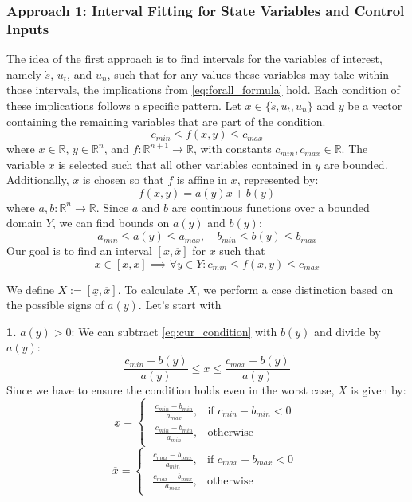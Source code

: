 \subsubsection{Approach 1: Interval Fitting for State Variables and Control Inputs} \label{subsubsec:interval_fitting}
The idea of the first approach is to find intervals for the variables of interest, namely $\dot{s}$, $u_t$, and $u_n$, such that for any values these
variables may take within those intervals, the implications from \eqref{eq:forall_formula} hold.
Each condition of these implications follows a specific pattern.
Let $x \in \{\dot{s}, u_t, u_n\}$ and $y$ be a vector containing the remaining variables that are part of the condition.
\begin{equation}
	\label{eq:cur_condition}
	c_{min} \leq f(x, y) \leq c_{max}
\end{equation}
where $x \in \mathbb{R}$, $y \in \mathbb{R}^n$, and $f: \mathbb{R}^{n+1} \to \mathbb{R}$, with constants $c_{min}, c_{max} \in \mathbb{R}$.
The variable $x$ is selected such that all other variables contained in $y$ are bounded.
Additionally, $x$ is chosen so that $f$ is affine in $x$, represented by:
\begin{equation}
	f(x, y) = a(y) x + b(y)
\end{equation}
where $a, b : \mathbb{R}^n \to \mathbb{R}$. Since $a$ and $b$ are continuous functions over a bounded domain $Y$, we can find bounds on $a(y)$ and $b(y)$:
\begin{equation}
	a_{min} \leq a(y) \leq a_{max}, \quad b_{min} \leq b(y) \leq b_{max}
\end{equation}
Our goal is to find an interval $[\underline{x}, \overline{x}]$ for $x$ such that
\begin{equation}
	x\in [\underline{x}, \overline{x}] \implies \forall y\in Y: c_{min} \leq f(x, y) \leq c_{max}
\end{equation}

We define $X := [\underline{x}, \overline{x}]$.
To calculate $X$, we perform a case distinction based on the possible signs of $a(y)$.
Let's start with

\textbf{1.
}
$a(y) > 0$:
We can subtract \eqref{eq:cur_condition} with $b(y)$ and divide by $a(y)$:
\[
	\frac{c_{min}-b(y)}{a(y)} \leq x \leq \frac{c_{max}-b(y)}{a(y)}
\]
Since we have to ensure the condition holds even in the worst case, $X$ is given by:
\[
	\underline{x} =
	\begin{cases}
		\begin{array}{ll}
			\frac{c_{min}-b_{min}}{a_{max}}, & \text{if } c_{min}-b_{min} < 0 \\[10pt]
			\frac{c_{min}-b_{min}}{a_{min}}, & \text{otherwise}
		\end{array}
	\end{cases}
\]
\[
	\overline{x} =
	\begin{cases}
		\begin{array}{ll}
			\frac{c_{max}-b_{max}}{a_{min}}, & \text{if } c_{max}-b_{max} < 0 \\[10pt]
			\frac{c_{max}-b_{max}}{a_{max}}, & \text{otherwise}
		\end{array}
	\end{cases}
\]

